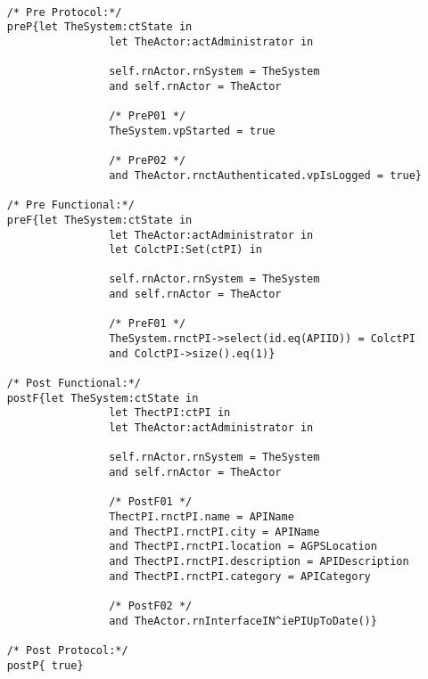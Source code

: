 	\scriptsize
	\vspace{0.5cm}
	\begin{lstlisting}[style=MessirStyle,firstnumber=auto,captionpos=b,caption={\msrmessir (MCL-oriented) specification of the operation \emph{oeUpdatePI}.},label=OM-actAdministrator-oeUpdatePI-MCL-LST]

	/* Pre Protocol:*/ 
	preP{let TheSystem:ctState in
					let TheActor:actAdministrator in
					
					self.rnActor.rnSystem = TheSystem
					and self.rnActor = TheActor
					
					/* PreP01 */
					TheSystem.vpStarted = true
					
					/* PreP02 */
					and TheActor.rnctAuthenticated.vpIsLogged = true}
	
	/* Pre Functional:*/
	preF{let TheSystem:ctState in
					let TheActor:actAdministrator in
					let ColctPI:Set(ctPI) in
					
					self.rnActor.rnSystem = TheSystem
					and self.rnActor = TheActor
					
					/* PreF01 */
					TheSystem.rnctPI->select(id.eq(APIID)) = ColctPI
					and ColctPI->size().eq(1)}
	
	/* Post Functional:*/ 
	postF{let TheSystem:ctState in
					let ThectPI:ctPI in
					let TheActor:actAdministrator in
					
					self.rnActor.rnSystem = TheSystem
					and self.rnActor = TheActor
					
					/* PostF01 */
					ThectPI.rnctPI.name = APIName
					and ThectPI.rnctPI.city = APIName
					and ThectPI.rnctPI.location = AGPSLocation
					and ThectPI.rnctPI.description = APIDescription
					and ThectPI.rnctPI.category = APICategory
					
					/* PostF02 */
					and TheActor.rnInterfaceIN^iePIUpToDate()}
	
	/* Post Protocol:*/ 
	postP{ true}
	
	\end{lstlisting}
	\normalsize 
	
	
	
	





